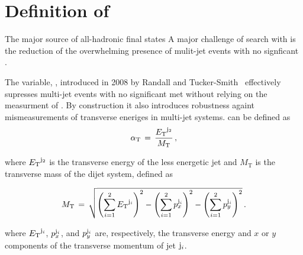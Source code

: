 \clearpage
\section{Definition of \texorpdfstring{\alphat}{AlphaT}\label{sec:alphat}}

The major source of all-hadronic final states
A major challenge of search with \met is the reduction of the 
overwhelming presence of mulit-jet events with no signficant \met.  

The variable, \alphat, introduced in 2008 by Randall and 
Tucker-Smith~\cite{Randall:2008rw, RA1Paper} effectively supresses multi-jet 
events with no significant met without relying on the measurment
of \met. By construction it also introduces robustness againt  mismeasurements 
of transverse eneriges in multi-jet systems.  \alphat can be defined as
\begin{equation}
\label{eq:alphat}
\alpha_{\text{T}}\, =\, \frac{{E_{\text T}}^{{\rm j}_2}}{M_\text{T}} \, ,
\end{equation}

where ${E_{\text T}}^{\rm j_2}$ is the transverse energy of the less energetic
jet and $M_\text{T}$ is the transverse mass of the dijet system,
defined as

\begin{equation}
  \label{eq:mt}
  M_\text{T}\, = \,\sqrt{ \left( \sum_{i=1}^2 {E_{\text T}}^{{\rm j}_i}
    \right)^2 - \left( \sum_{i=1}^2 p_x^{{\rm j}_i} \right)^2 - \left(
      \sum_{i=1}^2 p_y^{{\rm j}_i} \right)^2} \, .
\end{equation}

where ${E_{\text T}}^{{\rm j}_i}$, $p_x^{{\rm j}_i}$, and $p_y^{{\rm j}_i}$ are,
respectively, the transverse energy and $x$ or $y$ components of the
transverse momentum of jet ${\rm j}_i$.





